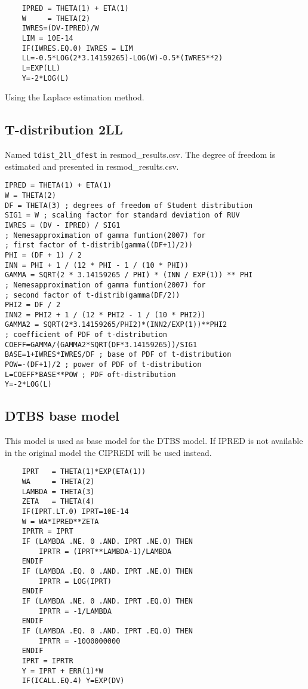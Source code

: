\begin{verbatim}
    IPRED = THETA(1) + ETA(1)
	W     = THETA(2)
	IWRES=(DV-IPRED)/W
	LIM = 10E-14
	IF(IWRES.EQ.0) IWRES = LIM
	LL=-0.5*LOG(2*3.14159265)-LOG(W)-0.5*(IWRES**2)
	L=EXP(LL)
	Y=-2*LOG(L)
\end{verbatim}

Using the Laplace estimation method.

\subsection{T-distribution 2LL}
Named \verb|tdist_2ll_dfest| in resmod\_results.csv. The degree of freedom is estimated and presented in resmod\_results.csv.

\begin{verbatim}
IPRED = THETA(1) + ETA(1)
W = THETA(2)
DF = THETA(3) ; degrees of freedom of Student distribution
SIG1 = W ; scaling factor for standard deviation of RUV
IWRES = (DV - IPRED) / SIG1
; Nemesapproximation of gamma funtion(2007) for
; first factor of t-distrib(gamma((DF+1)/2))
PHI = (DF + 1) / 2
INN = PHI + 1 / (12 * PHI - 1 / (10 * PHI))
GAMMA = SQRT(2 * 3.14159265 / PHI) * (INN / EXP(1)) ** PHI
; Nemesapproximation of gamma funtion(2007) for
; second factor of t-distrib(gamma(DF/2))
PHI2 = DF / 2
INN2 = PHI2 + 1 / (12 * PHI2 - 1 / (10 * PHI2))
GAMMA2 = SQRT(2*3.14159265/PHI2)*(INN2/EXP(1))**PHI2
; coefficient of PDF of t-distribution
COEFF=GAMMA/(GAMMA2*SQRT(DF*3.14159265))/SIG1
BASE=1+IWRES*IWRES/DF ; base of PDF of t-distribution
POW=-(DF+1)/2 ; power of PDF of t-distribution
L=COEFF*BASE**POW ; PDF oft-distribution
Y=-2*LOG(L)
\end{verbatim}

\subsection{DTBS base model}
This model is used as base model for the DTBS model. If IPRED is not available in the original model the CIPREDI will be used instead.
\begin{verbatim}
    IPRT   = THETA(1)*EXP(ETA(1))
	WA     = THETA(2)
	LAMBDA = THETA(3)
	ZETA   = THETA(4)
	IF(IPRT.LT.0) IPRT=10E-14
	W = WA*IPRED**ZETA
	IPRTR = IPRT
	IF (LAMBDA .NE. 0 .AND. IPRT .NE.0) THEN
		IPRTR = (IPRT**LAMBDA-1)/LAMBDA
	ENDIF
	IF (LAMBDA .EQ. 0 .AND. IPRT .NE.0) THEN
		IPRTR = LOG(IPRT)
	ENDIF
	IF (LAMBDA .NE. 0 .AND. IPRT .EQ.0) THEN
		IPRTR = -1/LAMBDA
	ENDIF
	IF (LAMBDA .EQ. 0 .AND. IPRT .EQ.0) THEN
		IPRTR = -1000000000
	ENDIF
	IPRT = IPRTR
	Y = IPRT + ERR(1)*W
	IF(ICALL.EQ.4) Y=EXP(DV)
\end{verbatim}

